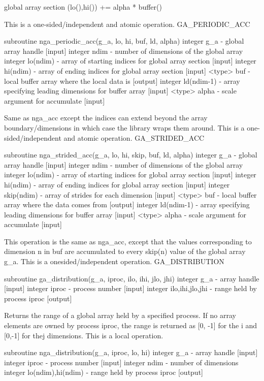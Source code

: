 global array section (lo(),hi()) += alpha {*} buffer()

This is a one-sided/independent and atomic operation. GA\_PERIODIC\_ACC

subroutine nga\_periodic\_acc(g\_a, lo, hi, buf, ld, alpha) integer
g\_a - global array handle {[}input{]} integer ndim - number of dimensions
of the global array integer lo(ndim) - array of starting indices for
global array section {[}input{]} integer hi(ndim) - array of ending
indices for global array section {[}input{]} <type> buf - local buffer
array where the local data is {[}output{]} integer ld(ndim-1) - array
specifying leading dimensions for buffer array {[}input{]} <type>
alpha - scale argument for accumulate {[}input{]}

Same as nga\_acc except the indices can extend beyond the array boundary/dimensions
in which case the library wraps them around. This is a one-sided/independent
and atomic operation. GA\_STRIDED\_ACC

subroutine nga\_strided\_acc(g\_a, lo, hi, skip, buf, ld, alpha) integer
g\_a - global array handle {[}input{]} integer ndim - number of dimensions
of the global array integer lo(ndim) - array of starting indices for
global array section {[}input{]} integer hi(ndim) - array of ending
indices for global array section {[}input{]} integer skip(ndim) -
array of strides for each dimension {[}input{]} <type> buf - local
buffer array where the data comes from {[}output{]} integer ld(ndim-1)
- array specifying leading dimensions for buffer array {[}input{]}
<type> alpha - scale argument for accumulate {[}input{]}

This operation is the same as nga\_acc, except that the values corresponding
to dimension n in buf are accumulated to every skip(n) value of the
global array g\_a. This is a onesided/independent operation. GA\_DISTRIBUTION

subroutine ga\_distribution(g\_a, iproc, ilo, ihi, jlo, jhi) integer
g\_a - array handle {[}input{]} integer iproc - process number {[}input{]}
integer ilo,ihi,jlo,jhi - range held by process iproc {[}output{]}

Returns the range of a global array held by a specified process. If
no array elements are owned by process iproc, the range is returned
as {[}0, -1{]} for the i and {[}0,-1{]} for thej dimensions. This
is a local operation.

subroutine nga\_distribution(g\_a, iproc, lo, hi) integer g\_a - array
handle {[}input{]} integer iproc - process number {[}input{]} integer
ndim - number of dimensions integer lo(ndim),hi(ndim) - range held
by process iproc {[}output{]}

